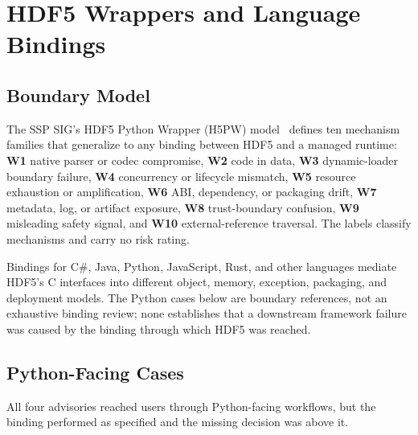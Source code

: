 \documentclass[../main.tex]{subfiles}
\begin{document}
\section{HDF5 Wrappers and Language Bindings}
\label{sec:wrappers}

\subsection{Boundary Model}

The SSP SIG's HDF5 Python Wrapper (H5PW) model~\cite{hdf5-python-wrapper-model}
defines ten mechanism families that generalize to any binding between HDF5 and
a managed runtime: \textbf{W1} native parser or codec compromise, \textbf{W2}
code in data, \textbf{W3} dynamic-loader boundary failure, \textbf{W4}
concurrency or lifecycle mismatch, \textbf{W5} resource exhaustion or
amplification, \textbf{W6} ABI,
dependency, or packaging drift, \textbf{W7} metadata, log, or artifact
exposure, \textbf{W8} trust-boundary confusion, \textbf{W9} misleading safety
signal, and \textbf{W10} external-reference traversal. The labels classify
mechanisms and carry no risk rating.

Bindings for C\#, Java, Python, JavaScript, Rust, and other languages mediate
HDF5's C interfaces into different object, memory, exception, packaging, and
deployment models. The Python cases below are boundary references, not an
exhaustive binding review; none establishes that a downstream framework
failure was caused by the binding through which HDF5 was reached.

\subsection{Python-Facing Cases}

All four advisories reached users through Python-facing workflows, but the
binding performed as specified and the missing decision was above it.
\end{document}
